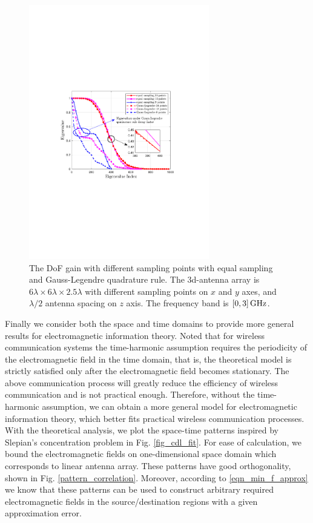\documentclass[12pt,draftclsnofoot,journal,onecolumn]{IEEEtran}
\begin{document}
\begin{figure}
	\centering 
	\includegraphics[width=0.7\textwidth]{figs/different_sampling_scheme_merge.pdf} 
	\caption{The DoF gain with different sampling points with equal sampling and Gauss-Legendre quadrature rule. The 3d-antenna array is $6\lambda \times 6\lambda \times 2.5\lambda$ with different sampling points on $x$ and $y$ axes, and $\lambda/2$ antenna spacing on $z$ axis. The frequency band is $[0,3]\,{\rm GHz}$.} 
	\label{different_sampling_scheme_merge}
\end{figure}

Finally we consider both the space and time domains to provide more general results for electromagnetic information theory. Noted that for wireless communication systems the time-harmonic assumption requires the periodicity of the electromagnetic field in the time domain, that is, the theoretical model is strictly satisfied only after the electromagnetic field becomes stationary. The above communication process will greatly reduce the efficiency of wireless communication and is not practical enough. Therefore, without the time-harmonic assumption, we can obtain a more general model for electromagnetic information theory, which better fits practical wireless communication processes. With the theoretical analysis, we plot the space-time patterns inspired by Slepian's concentration problem in Fig. \ref{fig_cdl_fit}. For ease of calculation, we bound the electromagnetic fields on one-dimensional space domain which corresponds to linear antenna array. These patterns have good orthogonality, shown in Fig. \ref{pattern_correlation}. Moreover, according to \eqref{eqn_min_f_approx} we know that these patterns can be used to construct arbitrary required electromagnetic fields in the source/destination regions with a given approximation error.
\end{document}
